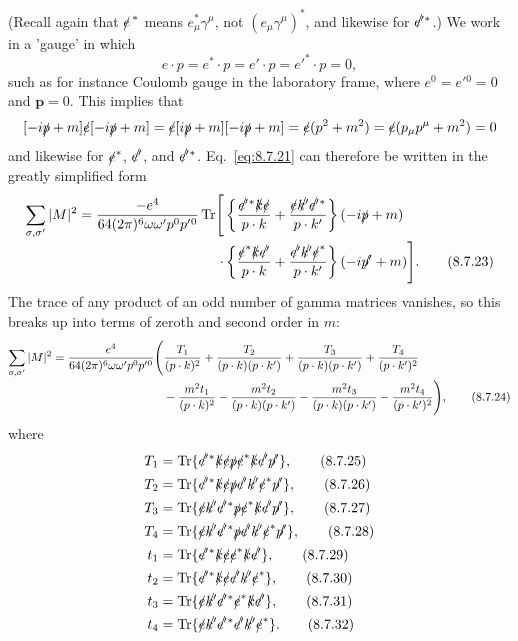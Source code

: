 \endgroup
(Recall again that $\sl{e}^{\,*}$ means $e^*_\mu\gamma^\mu$, not
$(e_\mu\gamma^\mu)^*$, and likewise for $\sl{e'}{}^*$.) We work in a
'gauge' in which
\begin{equation}
e\cdot p=e^*\cdot p=e'\cdot p=e'^*\cdot p=0,
\tag{8.7.22}\label{eq:8.7.22}
\end{equation}
such as for instance Coulomb gauge in the laboratory frame, where
$e^0=e'{}^0=0$ and $\mathbf p=0$. This implies that
\[
[-i\sl{p}+m]\sl{e}[-i\sl{p}+m]
=\sl{e}[i\sl{p}+m][-i\sl{p}+m]
=\sl{e}(p^2+m^2)=\sl{e}(p_\mu p^\mu+m^2)=0
\]
and likewise for $\sl{e}^*$, $\sl{e'}$, and $\sl{e'}{}^*$. Eq.~\eqref{eq:8.7.21}
can therefore be written in the greatly simplified form
\begin{align}
\sum_{\sigma,\sigma'}|M|^2
={-e^4\over64(2\pi)^6\omega\omega'p^0p'{}^0}
\operatorname{Tr}\Biggl[&\left\{{\sl{e'}{}^*\sl{k}\sl{e}\over p\cdot k}
+{\sl{e}\sl{k'}\sl{e'}{}^*\over p\cdot k'}\right\}(-i\sl{p}+m)
\notag\\[-2pt]
\cdot&\left\{{\sl{e}^*\sl{k}\sl{e'}\over p\cdot k}
+{\sl{e'}\sl{k'}\sl{e}^*\over p\cdot k'}\right\}(-i\sl{p'}+m)\Biggr].
\tag{8.7.23}\label{eq:8.7.23}
\end{align}
The trace of any product of an odd number of gamma matrices vanishes, so this
breaks up into terms of zeroth and second order in $m$:
\begin{align}
\sum_{\sigma,\sigma'}|M|^2={e^4\over64(2\pi)^6\omega\omega'p^0p'{}^0}
\Biggl(&{T_1\over(p\cdot k)^2}+{T_2\over(p\cdot k)(p\cdot k')}
+{T_3\over(p\cdot k)(p\cdot k')}+{T_4\over(p\cdot k')^2}
\notag\\[-2pt]
&-{m^2t_1\over(p\cdot k)^2}-{m^2t_2\over(p\cdot k)(p\cdot k')}
-{m^2t_3\over(p\cdot k)(p\cdot k')}-{m^2t_4\over(p\cdot k')^2}\Biggr),
\tag{8.7.24}\label{eq:8.7.24}
\end{align}
where
\begin{align}
T_1&=\operatorname{Tr}\{\sl{e'}{}^*\sl{k}\sl{e}\sl{p}\sl{e}^*\sl{k}\sl{e'}\sl{p'}\},
\tag{8.7.25}\label{eq:8.7.25}\\
T_2&=\operatorname{Tr}\{\sl{e'}{}^*\sl{k}\sl{e}\sl{p}\sl{e'}\sl{k'}\sl{e}^*\sl{p'}\},
\tag{8.7.26}\label{eq:8.7.26}\\
T_3&=\operatorname{Tr}\{\sl{e}\sl{k'}\sl{e'}{}^*\sl{p}\sl{e}^*\sl{k}\sl{e'}\sl{p'}\},
\tag{8.7.27}\label{eq:8.7.27}\\
T_4&=\operatorname{Tr}\{\sl{e}\sl{k'}\sl{e'}{}^*\sl{p}\sl{e'}\sl{k'}\sl{e}^*\sl{p'}\},
\tag{8.7.28}\label{eq:8.7.28}\\
t_1&=\operatorname{Tr}\{\sl{e'}{}^*\sl{k}\sl{e}\sl{e}^*\sl{k}\sl{e'}\},
\tag{8.7.29}\label{eq:8.7.29}\\
t_2&=\operatorname{Tr}\{\sl{e'}{}^*\sl{k}\sl{e}\sl{e'}\sl{k'}\sl{e}^*\},
\tag{8.7.30}\label{eq:8.7.30}\\
t_3&=\operatorname{Tr}\{\sl{e}\sl{k'}\sl{e'}{}^*\sl{e}^*\sl{k}\sl{e'}\},
\tag{8.7.31}\label{eq:8.7.31}\\
t_4&=\operatorname{Tr}\{\sl{e}\sl{k'}\sl{e'}{}^*\sl{e'}\sl{k'}\sl{e}^*\}.
\tag{8.7.32}\label{eq:8.7.32}
\end{align}
